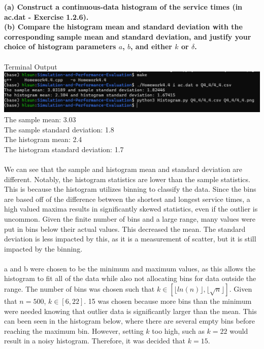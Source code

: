 \textbf{(a) Construct a continuous-data histogram of the service times (in ac.dat - Exercise 1.2.6).\\
(b) Compare the histogram mean and standard deviation with the corresponding sample mean and standard deviation, and justify your choice of histogram parameters $a$, $b$, and either $k$ or $\delta$.}\\\\
\noindent Terminal Output\\
\includegraphics[scale=0.6]{Sections/Q4/4_4_terminal.png}\\

\noindent The sample mean: 3.03\\
The sample standard deviation: 1.8\\
The histogram mean: 2.4\\
The histogram standard deviation: 1.7\\\\

\noindent We can see that the sample and histogram mean and standard deviation are different. Notably, the histogram statistics are lower than the sample statistics. This is because the histogram utilizes binning to classify the data. Since the bins are based off of the difference between the shortest and longest service times, a high valued maxima results in significantly skewed statistics, even if the outlier is uncommon. Given the finite number of bins and a large range, many values were put in bins below their actual values. This decreased the mean. The standard deviation is less impacted by this, as it is a measurement of scatter, but it is still impacted by the binning.\\\\

\noindent a and b were chosen to be the minimum and maximum values, as this allows the histogram to fit all of the data while also not allocating bins for data outside the range. The number of bins was chosen such that $k \in [\lfloor ln(n) \rfloor, \lfloor\sqrt{n}\rfloor]$. Given that $n = 500$, $k \in [6,22]$. 15 was chosen because more bins than the minimum were needed knowing that outlier data is significantly larger than the mean. This can been seen in the histogram below, where there are several empty bins before reaching the maximum bin. However, setting $k$ too high, such as $k=22$ would result in a noisy histogram. Therefore, it was decided that $k=15$.\\\\


